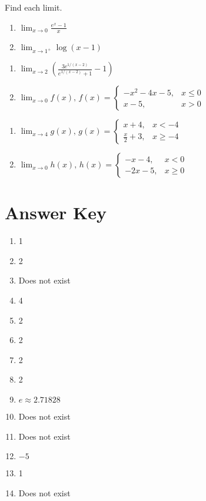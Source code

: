 Find each limit.
\begin{multicols}{2}
\begin{enumerate}	\setcounter{enumi}{\value{Review}}
	\item $\lim_{x \to 0} \frac{e^x - 1}{x}$
	\item $\lim_{x \to 1^+} \log(x-1)$
\end{enumerate}	\setcounter{Review}{\value{enumi}}
\end{multicols}
\smallskip
\begin{multicols}{2}
\begin{enumerate}	\setcounter{enumi}{\value{Review}}
	\item $\lim_{x \to 2} \left(\frac{3e^{1/(x-2)}}{e^{1/(x-2)}+1}-1\right)$
	\item $\lim_{x \to 0} f(x), \, f(x) =  \begin{cases} -x^2-4x-5, & x \leq 0 \\ x-5, & x > 0 \end{cases}$
\end{enumerate}	\setcounter{Review}{\value{enumi}}
\end{multicols}
\smallskip 
\begin{multicols}{2}
\begin{enumerate}	\setcounter{enumi}{\value{Review}}
	\item $\lim_{x \to 4} g(x), \, g(x) = \begin{cases} x+4, & x < -4 \\ \frac{x}{2}+3, & x \geq -4 \end{cases}$
	\item $\lim_{x \to 0} h(x), \, h(x) = \begin{cases} -x-4, & x< 0 \\ -2x-5, & x \geq 0 \end{cases}$
\end{enumerate}
\end{multicols}

\newpage

\section{Answer Key}

\begin{enumerate}
	\item 1
    \item 2 
    \item Does not exist
    \item 4
    \item 2
    \item 2
    \item 2
    \item 2
    \item $e \approx 2.71828$
    \item Does not exist
    \item Does not exist
    \item $-5$
    \item 1
    \item Does not exist
\end{enumerate}